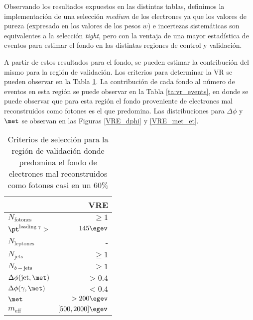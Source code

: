 Observando los resultados expuestos en las distintas tablas, definimos la implementación de una selección \textit{medium} de los electrones ya que los valores de pureza (expresado en los valores de los pesos $w$) e incertezas sistemáticas son equivalentes a la selección \textit{tight}, pero con la ventaja de una mayor estadística de eventos para estimar el fondo en las distintas regiones de control y validación.

A partir de estos resultados para el fondo, se pueden estimar la contribución del mismo para la región de validación. Los criterios para determinar la VR se pueden observar en la Tabla \ref{ta:vr_crit}. La contribución de cada fondo al número de eventos en esta región se puede observar en la Tabla \ref{ta:vr_events}, en donde se puede observar que para esta región el fondo proveniente de electrones mal reconstruidos como fotones es el que predomina. Las distribuciones para $\Delta \phi$ y $\met$ se observan en las Figuras \ref{VRE_dphi} y \ref{VRE_met_et}.



\begin{table}
\centering
\caption{Criterios de selección para la región de validación donde predomina el fondo de electrones mal reconstruidos como fotones casi en un $ 60\%$}
  \begin{tabular}{l|r}
  \hline
  \hline
  & VRE \\
  \hline
  $N_{\mathrm{fotones}}$                  &       $\ge1$  \\
  $\pt^{\text{leading}\: \gamma} >$         &    $145\egev$  \\
  $N_{\mathrm{leptones}}$                  &           -   \\
  $N_{\mathrm{jets}}$                     &       $\ge1$  \\
  $N_{b-\mathrm{jets}}$                   &       $\ge1$  \\
  $\Delta\phi(\text{jet}, \met)$          &       $>0.4$  \\
  $\Delta\phi(\gamma, \met)$                &       $<0.4$  \\
  ${\met}$                                &   $>200\egev$  \\
  $m_{\text{eff}}$                               &  $[500, 2000]\egev$  \\
  \hline
  \hline
\end{tabular}
\label{ta:vr_crit}
\end{table}

